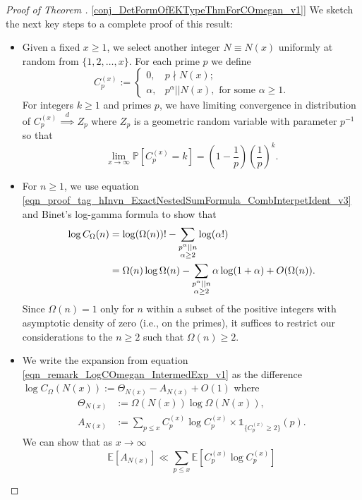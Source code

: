 \documentclass[11pt,reqno,a4letter]{article}
\newcommand{\hlocalref}[1]{\hyperref[#1]{\ref{#1}}}
\numberwithin{equation}{section}
\numberwithin{figure}{section}
\numberwithin{table}{section}
\let\citep\cite
\theoremstyle{plain}
\numberwithin{theorem}{section}
\theoremstyle{definition}
\theoremstyle{remark}
\begin{document}
\begin{proof}[Proof of Theorem \hlocalref{conj_DetFormOfEKTypeThmForCOmegan_v1}]
We sketch the next key steps to a complete proof of this result: 
\begin{itemize}
\item
Given a fixed $x \geq 1$, we select another integer $N \equiv N(x)$ uniformly at random from 
$\{1,2,\ldots,x\}$. For each prime $p$ we define 
\[
C_p^{(x)} := \begin{cases} 0, & p \nmid N(x); \\ 
	\alpha, & p^{\alpha} || N(x), \text{ for some } \alpha \geq 1. 
	\end{cases}
\]
For integers $k \geq 1$ and primes $p$, we have limiting convergence in distribution of 
$C_p^{(x)} \overset{d}{\implies} Z_p$ where $Z_p$ is 
a geometric random variable with parameter $p^{-1}$ so that 
\citep[\S 1.2]{LOG-COMB-STRUCTS-BOOK} 
\[
\lim_{x \rightarrow \infty} \mathbb{P}\left[C_p^{(x)} = k\right] = 
     \left(1 - \frac{1}{p}\right)\left(\frac{1}{p}\right)^k. 
\]
\item 
For $n \geq 1$, we use 
equation \eqref{eqn_proof_tag_hInvn_ExactNestedSumFormula_CombInterpetIdent_v3} and 
Binet's log-gamma formula \cite[\S 5.9(i)]{NISTHB} to show that 
\begin{align}
\notag
\log C_{\Omega}(n) & = \log (\Omega(n))! - 
	\sum_{\substack{p^{\alpha}||n \\ \alpha \geq 2}} \log(\alpha!) \\ 
\label{eqn_remark_LogCOmegan_IntermedExp_v1}
	& = \Omega(n) \log \Omega(n) - \sum_{\substack{p^{\alpha}||n \\ \alpha \geq 2}} 
	\alpha \log(1 + \alpha) + O(\Omega(n)). 
\end{align}
Since $\Omega(n) = 1$ only for $n$ within a subset of the positive 
integers with asymptotic density of zero (i.e., on the primes), 
it suffices to restrict our considerations 
to the $n \geq 2$ such that $\Omega(n) \geq 2$. 
\item 
We write the expansion from equation 
\eqref{eqn_remark_LogCOmegan_IntermedExp_v1} as the difference 
$\log C_{\Omega}(N(x)) := \Theta_{N(x)} - A_{N(x)} + O(1)$ where 
\begin{align*}
\Theta_{N(x)} & := \Omega(N(x)) \log \Omega(N(x)), \\ 
A_{N(x)} & := \sum_{p \leq x} C_p^{(x)} \log C_p^{(x)} \times \mathds{1}_{\{C_p^{(x)} \geq 2\}}(p). 
\end{align*}
We can show that as $x \rightarrow \infty$ 
\[
\mathbb{E}[A_{N(x)}] \ll \sum_{p \leq x} \mathbb{E}\left[C_p^{(x)} \log C_p^{(x)}\right] 
\]
\end{itemize}
\end{proof}
\end{document}

